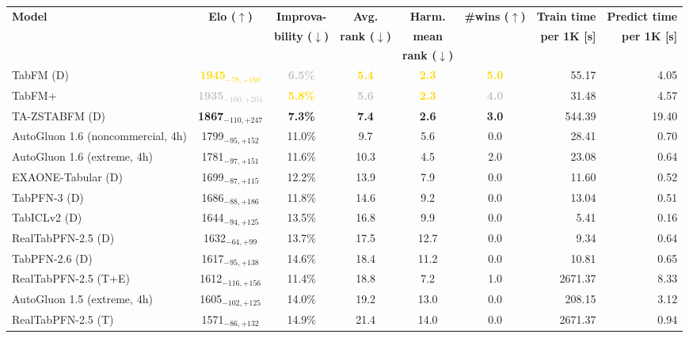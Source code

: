 \begin{tabular}{lcccccrr}
\toprule
\textbf{Model} & \textbf{Elo ($\uparrow$)} & \textbf{Improva-} & \textbf{Avg.} & \textbf{Harm.} & \textbf{\#wins ($\uparrow$)} & \textbf{Train time} & \textbf{Predict time} \\
 &  & \textbf{bility ($\downarrow$)} & \textbf{rank ($\downarrow$)} & \textbf{mean} &  & \textbf{per 1K [s]} & \textbf{per 1K [s]} \\
 &  &  &  & \textbf{rank ($\downarrow$)} &  &  &  \\
\midrule
TabFM (D) & \textcolor{gold}{\textbf{1945${}_{-78,+160}$}} & \textcolor{silver}{\textbf{6.5\%}} & \textcolor{gold}{\textbf{5.4}} & \textcolor{gold}{\textbf{2.3}} & \textcolor{gold}{\textbf{5.0}} & 55.17 & 4.05 \\
TabFM+ & \textcolor{silver}{\textbf{1935${}_{-100,+204}$}} & \textcolor{gold}{\textbf{5.8\%}} & \textcolor{silver}{\textbf{5.6}} & \textcolor{gold}{\textbf{2.3}} & \textcolor{silver}{\textbf{4.0}} & 31.48 & 4.57 \\
[New] TA-ZSTABFM (D) & \textcolor{bronze}{\textbf{1867${}_{-110,+247}$}} & \textcolor{bronze}{\textbf{7.3\%}} & \textcolor{bronze}{\textbf{7.4}} & \textcolor{bronze}{\textbf{2.6}} & \textcolor{bronze}{\textbf{3.0}} & 544.39 & 19.40 \\
AutoGluon 1.6 (noncommercial, 4h) & 1799${}_{-95,+152}$ & 11.0\% & 9.7 & 5.6 & 0.0 & 28.41 & 0.70 \\
AutoGluon 1.6 (extreme, 4h) & 1781${}_{-97,+151}$ & 11.6\% & 10.3 & 4.5 & 2.0 & 23.08 & 0.64 \\
EXAONE-Tabular (D) & 1699${}_{-87,+115}$ & 12.2\% & 13.9 & 7.9 & 0.0 & 11.60 & 0.52 \\
TabPFN-3 (D) & 1686${}_{-88,+186}$ & 11.8\% & 14.6 & 9.2 & 0.0 & 13.04 & 0.51 \\
TabICLv2 (D) & 1644${}_{-94,+125}$ & 13.5\% & 16.8 & 9.9 & 0.0 & 5.41 & 0.16 \\
RealTabPFN-2.5 (D) & 1632${}_{-64,+99}$ & 13.7\% & 17.5 & 12.7 & 0.0 & 9.34 & 0.64 \\
TabPFN-2.6 (D) & 1617${}_{-95,+138}$ & 14.6\% & 18.4 & 11.2 & 0.0 & 10.81 & 0.65 \\
RealTabPFN-2.5 (T+E) & 1612${}_{-116,+156}$ & 11.4\% & 18.8 & 7.2 & 1.0 & 2671.37 & 8.33 \\
AutoGluon 1.5 (extreme, 4h) & 1605${}_{-102,+125}$ & 14.0\% & 19.2 & 13.0 & 0.0 & 208.15 & 3.12 \\
RealTabPFN-2.5 (T) & 1571${}_{-86,+132}$ & 14.9\% & 21.4 & 14.0 & 0.0 & 2671.37 & 0.94 \\

\end{tabular}
